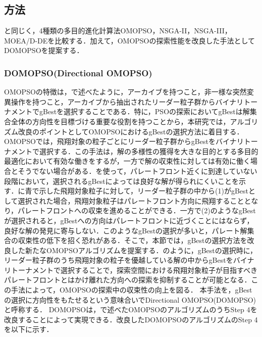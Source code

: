 \subsection{方法}
と同じく，4種類の多目的進化計算法OMOPSO，NSGA-II，NSGA-III，MOEA/D-DEを比較する．加えて，OMOPSOの探索性能を改良した手法としてDOMOPSOを提案する．

\subsubsection{DOMOPSO(Directional OMOPSO)}
OMOPSOの特徴は，で述べたように，アーカイブを持つこと，非一様な突然変異操作を持つこと，アーカイブから抽出されたリーダー粒子群からバイナリトーナメントでgBestを選択することである．特に，PSOの探索においてgBestは解集合全体の方向性を目標づける重要な役割を持つことから，本研究では，アルゴリズム改良のポイントとしてOMOPSOにおけるgBestの選択方法に着目する．OMOPSOでは，飛翔対象の粒子ごとにリーダー粒子群からgBestをバイナリトーナメントで選択する．この手法は，解の多様性の獲得を大きな目的とする多目的最適化において有効な働きをするが，一方で解の収束性に対しては有効に働く場合とそうでない場合がある．を使って，パレートフロント近くに到達していない段階において，選択されるgBestによっては良好な解が得られにくいことを示す．に青で示した飛翔対象粒子に対して，リーダー粒子群の中から(1)がgBestとして選択された場合，飛翔対象粒子はパレートフロント方向に飛翔することとなり，パレートフロントへの収束を進めることができる．一方で(2)のようなgBestが選択されると，gBestへの方向はパレートフロントに近づくことにはならず，良好な解の発見に寄与しない．このようなgBestの選択が多いと，パレート解集合の収束性の低下を招く恐れがある．そこで，本節では，gBestの選択方法を改良した新たなOMOPSOアルゴリズムを提案する．のように，gBestの選択時に，リーダー粒子群のうち飛翔対象の粒子を優越している解の中からgBestをバイナリトーナメントで選択することで，探索空間における飛翔対象粒子が目指すべきパレートフロントとはかけ離れた方向への探索を抑制することが可能となる．この手法によって，OMOPSOの探索中の収束性の向上を図る．
本手法を，gBestの選択に方向性をもたせるという意味合いでDirectional OMOPSO(DOMOPSO)と呼称する．
DOMOPSOは，で述べたOMOPSOのアルゴリズムのうちStep 4を改良することによって実現できる．改良したDOMOPSOのアルゴリズムのStep 4を以下に示す．

